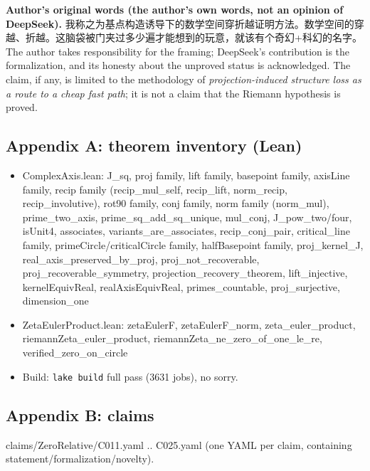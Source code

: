 \documentclass[
]{article}
\providecommand{\tightlist}{%
  \setlength{\itemsep}{0pt}\setlength{\parskip}{0pt}}
\begin{document}
\textbf{Author's original words (the author's own words, not an opinion
of DeepSeek).}
我称之为基点构造诱导下的数学空间穿折越证明方法。数学空间的穿越、折越。这脑袋被门夹过多少遍才能想到的玩意，就该有个奇幻+科幻的名字。The
author takes responsibility for the framing; DeepSeek's contribution is
the formalization, and its honesty about the unproved status is
acknowledged. The claim, if any, is limited to the methodology of
\emph{projection-induced structure loss as a route to a cheap fast
path}; it is not a claim that the Riemann hypothesis is proved.

\subsection{Appendix A: theorem inventory
(Lean)}\label{appendix-a-theorem-inventory-lean}

\begin{itemize}
\tightlist
\item
  ComplexAxis.lean: J\_sq, proj family, lift family, basepoint family,
  axisLine family, recip family (recip\_mul\_self, recip\_lift,
  norm\_recip, recip\_involutive), rot90 family, conj family, norm
  family (norm\_mul), prime\_two\_axis, prime\_sq\_add\_sq\_unique,
  mul\_conj, J\_pow\_two/four, isUnit4, associates,
  variants\_are\_associates, recip\_conj\_pair, critical\_line family,
  primeCircle/criticalCircle family, halfBasepoint family,
  proj\_kernel\_J, real\_axis\_preserved\_by\_proj,
  proj\_not\_recoverable, proj\_recoverable\_symmetry,
  projection\_recovery\_theorem, lift\_injective, kernelEquivReal,
  realAxisEquivReal, primes\_countable, proj\_surjective, dimension\_one
\item
  ZetaEulerProduct.lean: zetaEulerF, zetaEulerF\_norm,
  zeta\_euler\_product, riemannZeta\_euler\_product,
  riemannZeta\_ne\_zero\_of\_one\_le\_re, verified\_zero\_on\_circle
\item
  Build: \texttt{lake\ build} full pass (3631 jobs), no sorry.
\end{itemize}

\subsection{Appendix B: claims}\label{appendix-b-claims}

claims/ZeroRelative/C011.yaml .. C025.yaml (one YAML per claim,
containing statement/formalization/novelty).
\end{document}
